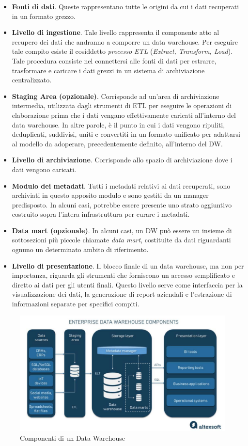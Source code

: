 \begin{itemize}
    \item \textbf{Fonti di dati}. Queste rappresentano tutte le origini da cui i dati recuperati in un formato grezzo.
    \item \textbf{Livello di ingestione}. Tale livello rappresenta il componente atto al recupero dei dati che andranno a comporre un data warehouse. Per eseguire tale compito esiste il cosiddetto \textit{processo ETL} (\textit{Extract, Transform, Load}). Tale procedura consiste nel connettersi alle fonti di dati per estrarre, trasformare e caricare i dati grezzi in un sistema di archiviazione centralizzato.
    \item \textbf{Staging Area (opzionale)}. Corrisponde ad un'area di archiviazione intermedia, utilizzata dagli strumenti di ETL per eseguire le operazioni di elaborazione prima che i dati vengano effettivamente caricati all'interno del data warehouse. In altre parole, è il punto in cui i dati vengono ripuliti, deduplicati, suddivisi, uniti e convertiti in un formato unificato per adattarsi al modello da adoperare, precedentemente definito, all'interno del DW. 
    \item \textbf{Livello di archiviazione}. Corrisponde allo spazio di archiviazione dove i dati vengono caricati.
    \item \textbf{Modulo dei metadati}. Tutti i metadati relativi ai dati recuperati, sono archiviati in questo apposito modulo e sono gestiti da un manager predisposto. In alcuni casi, potrebbe essere presente uno strato aggiuntivo costruito sopra l'intera infrastruttura per curare i metadati. 
    \item \textbf{Data mart (opzionale)}. In alcuni casi, un DW può essere un insieme di sottosezioni più piccole chiamate \textit{data mart}, costituite da dati riguardanti ognuno un determinato ambito di riferimento.
    \item \textbf{Livello di presentazione}. Il blocco finale di un data warehouse, ma non per importanza, riguarda gli strumenti che forniscono un accesso semplificato e diretto ai dati per gli utenti finali. Questo livello serve come interfaccia per la visualizzazione dei dati, la generazione di report aziendali e l'estrazione di informazioni separate per specifici compiti.
\end{itemize}

\begin{figure}[H]
    \centering
    \includegraphics[width=0.8\linewidth]{figure/capitolo_2/Data Warehouse Components.pdf}
    \caption{Componenti di un Data Warehouse}
    \label{fig:Data Warehouse Components}
\end{figure}

